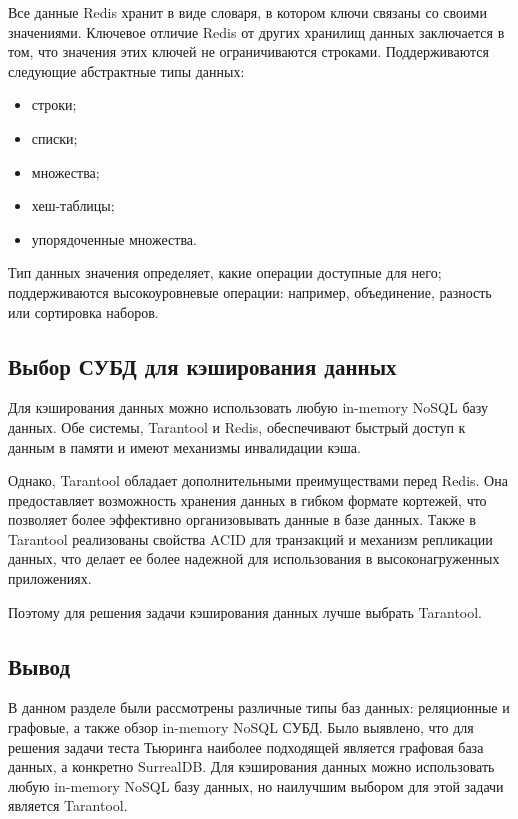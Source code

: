 Все данные Redis хранит в виде словаря, в котором ключи связаны со своими значениями. Ключевое отличие Redis от других хранилищ данных заключается в том, что значения этих ключей не ограничиваются строками. Поддерживаются следующие абстрактные типы данных:

\begin{itemize}
\item строки;
\item списки;
\item множества;
\item хеш-таблицы;
\item упорядоченные множества.
\end{itemize}

Тип данных значения определяет, какие операции доступные для него; поддерживаются высокоуровневые операции: например, объединение, разность или сортировка наборов.

\subsection{Выбор СУБД для кэширования данных}

Для кэширования данных можно использовать любую in-memory NoSQL базу данных. Обе системы, Tarantool и Redis, обеспечивают быстрый доступ к данным в памяти и имеют механизмы инвалидации кэша. 

Однако, Tarantool обладает дополнительными преимуществами перед Redis. Она предоставляет возможность хранения данных в гибком формате кортежей, что позволяет более эффективно организовывать данные в базе данных. Также в Tarantool реализованы свойства ACID для транзакций и механизм репликации данных, что делает ее более надежной для использования в высоконагруженных приложениях.

Поэтому для решения задачи кэширования данных лучше выбрать Tarantool.

\subsection*{Вывод}

В данном разделе были рассмотрены различные типы баз данных: реляционные и графовые, а также обзор in-memory NoSQL СУБД. Было выявлено, что для решения задачи теста Тьюринга наиболее подходящей является графовая база данных, а конкретно SurrealDB. Для кэширования данных можно использовать любую in-memory NoSQL базу данных, но наилучшим выбором для этой задачи является Tarantool.








